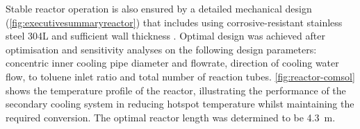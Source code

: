 

Stable reactor operation is also ensured by a detailed mechanical design (\cref{fig:executivesummaryreactor}) that includes using corrosive-resistant stainless steel 304L and sufficient wall thickness \cite{cm_selection_nodate}. Optimal design was achieved after optimisation and sensitivity analyses on the following design parameters: concentric inner cooling pipe diameter and flowrate, direction of cooling water flow,  to toluene inlet ratio and total number of reaction tubes. \cref{fig:reactor-comsol} shows the temperature profile of the reactor, illustrating the performance of the secondary cooling system in reducing hotspot temperature whilst maintaining the required conversion. The optimal reactor length was determined to be \SI{4.3}{\m}.  %


